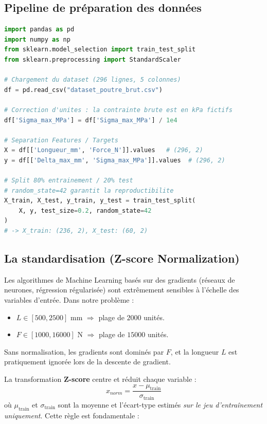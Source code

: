 \documentclass[journal, a4paper, twocolumn]{IEEEtran}
\begin{document}
\subsection{Pipeline de préparation des données}

\begin{lstlisting}[language=Python, caption=Chargement nettoyage et separation Train/Test]
import pandas as pd
import numpy as np
from sklearn.model_selection import train_test_split
from sklearn.preprocessing import StandardScaler

# Chargement du dataset (296 lignes, 5 colonnes)
df = pd.read_csv("dataset_poutre_brut.csv")

# Correction d'unites : la contrainte brute est en kPa fictifs
df['Sigma_max_MPa'] = df['Sigma_max_MPa'] / 1e4

# Separation Features / Targets
X = df[['Longueur_mm', 'Force_N']].values   # (296, 2)
y = df[['Delta_max_mm', 'Sigma_max_MPa']].values  # (296, 2)

# Split 80% entrainement / 20% test
# random_state=42 garantit la reproductibilite
X_train, X_test, y_train, y_test = train_test_split(
    X, y, test_size=0.2, random_state=42
)
# -> X_train: (236, 2), X_test: (60, 2)
\end{lstlisting}

\subsection{La standardisation (Z-score Normalization)}

Les algorithmes de Machine Learning basés sur des gradients (réseaux de neurones, régression régularisée) sont extrêmement sensibles à l'échelle des variables d'entrée. Dans notre problème :
\begin{itemize}
    \item $L \in [500, 2500]$ mm $\Rightarrow$ plage de $2000$ unités.
    \item $F \in [1000, 16000]$ N $\Rightarrow$ plage de $15000$ unités.
\end{itemize}
Sans normalisation, les gradients sont dominés par $F$, et la longueur $L$ est pratiquement ignorée lors de la descente de gradient.

La transformation \textbf{Z-score} centre et réduit chaque variable :
\begin{equation}
    x_{norm} = \frac{x - \mu_{\text{train}}}{\sigma_{\text{train}}}
\end{equation}
où $\mu_{\text{train}}$ et $\sigma_{\text{train}}$ sont la moyenne et l'écart-type estimés \emph{sur le jeu d'entraînement uniquement}. Cette règle est fondamentale :
\end{document}
